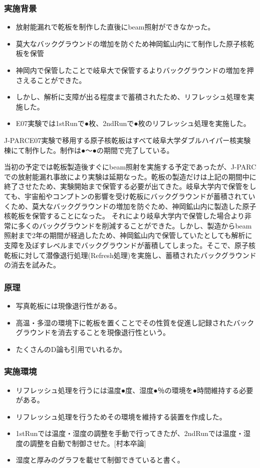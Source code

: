 \documentclass[12pt,a4paper]{jarticle}
\begin{document}
\subsubsection{実施背景}
\begin{itemize}
 \item 放射能漏れで乾板を制作した直後にbeam照射ができなかった。
 \item 莫大なバックグラウンドの増加を防ぐため神岡鉱山内にて制作した原子核乾板を保管
 \item 神岡内で保管したことで岐阜大で保管するよりバックグラウンドの増加を押さえることができた。
 \item しかし、解析に支障が出る程度まで蓄積されたため、リフレッシュ処理を実施した。
 \item E07実験では1stRunで●枚、2ndRunで●枚のリフレッシュ処理を実施した。
\end{itemize}
J-PARCE07実験で移用する原子核乾板はすべて岐阜大学ダブルハイパー核実験棟にて制作した。制作は●～●の期間で完了している。\par
当初の予定では乾板製造後すぐにbeam照射を実施する予定であったが、J-PARCでの放射能漏れ事故により実験は延期なった。乾板の製造だけは上記の期間中に終了させたため、実験開始まで保管する必要が出てきた。岐阜大学内で保管をしても、宇宙船やコンプトンの影響を受け乾板にバックグラウンドが蓄積されていくため、莫大なバックグラウンドの増加を防ぐため、神岡鉱山内に製造した原子核乾板を保管することになった。
それにより岐阜大学内で保管した場合より非常に多くのバックグラウンドを削減することができた。しかし、製造からbeam照射まで2年の期間が経過したため、神岡鉱山内で保管していたとしても解析に支障を及ぼすレベルまでバックグラウンドが蓄積してしまった。そこで、原子核乾板に対して潜像退行処理(Refresh処理)を実施し、蓄積されたバックグラウンドの消去を試みた。
\subsubsection{原理}
\begin{itemize}
 \item 写真乾板には現像退行性がある。
 \item 高温・多湿の環境下に乾板を置くことでその性質を促進し記録されたバックグラウンドを消去することを現像退行性という。
 \item たくさんのD論も引用でいれるか。
\end{itemize}
\subsubsection{実施環境}
\begin{itemize}
 \item リフレッシュ処理を行うには温度●度、湿度●％の環境を●時間維持する必要がある。
 \item リフレッシュ処理を行うためその環境を維持する装置を作成した。
 \item 1stRunでは温度・湿度の調整を手動で行ってきたが、2ndRunでは温度・湿度の調整を自動で制御させた。[村本卒論]
 \item 湿度と厚みのグラフを載せて制御できていると書く。
\end{itemize}
\end{document}

